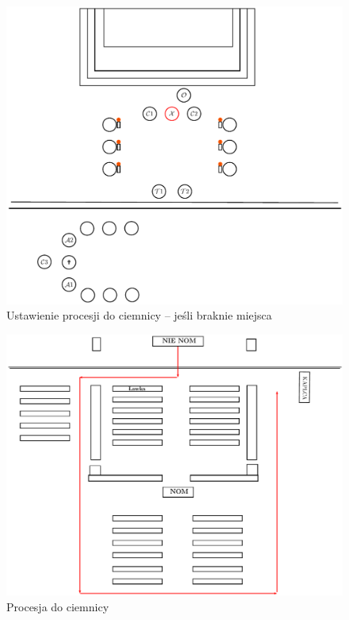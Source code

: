 \begin{figure}[h]
\begin{minipage}{0.6\linewidth}
            \includegraphics[width=\linewidth]{Figures/Czwartek/Procesja1.pdf}
            \caption{Ustawienie procesji do ciemnicy -- jeśli braknie miejsca}
            \label{fig:procesja2}
      \end{minipage}
\end{figure}
\begin{figure}[b]
      \centering
      \includegraphics[width=0.9\linewidth]{Figures/Czwartek/Procesja3.pdf}
      \caption{Procesja do ciemnicy}
      \label{fig:procesja3}
\end{figure}
\clearpage
